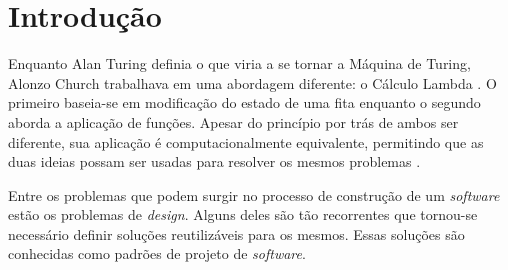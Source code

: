 
\chapter{Introdução}
%

Enquanto Alan Turing definia o que viria a 
se tornar a Máquina de Turing, Alonzo Church 
trabalhava em uma abordagem diferente: o Cálculo Lambda
\cite{church1932set,church1936unsolvable,sep-turing-machine}. 
O primeiro baseia-se em modificação do estado de 
uma fita enquanto o segundo aborda a aplicação 
de funções. Apesar do princípio por trás de ambos 
ser diferente, sua aplicação é computacionalmente 
equivalente, permitindo que as duas ideias possam 
ser usadas para resolver os mesmos problemas
\cite{sep-church-turing}.


Entre os problemas que podem surgir no 
processo de construção de um \textit{software} 
estão os problemas de \textit{design}. Alguns 
deles são tão recorrentes que tornou-se 
necessário definir soluções reutilizáveis 
para os mesmos. Essas soluções são conhecidas 
como padrões de projeto de \textit{software}. 

